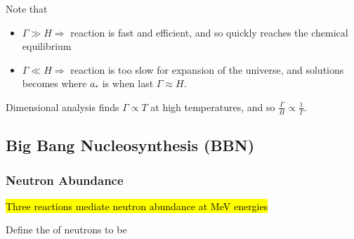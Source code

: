 \documentclass{article}
\begin{document}
Note that
\begin{itemize}
    \item $\Gamma \gg H \Rightarrow$ reaction is fast and efficient, and so quickly reaches the chemical equilibrium 
    \item $\Gamma \ll H \Rightarrow$ reaction is too slow for expansion of the universe, and solutions becomes 
    where $a_\ast$ is when last $\Gamma \approx H$. 
\end{itemize}

Dimensional analysis finds $\Gamma \propto T$ at high temperatures, and so $\frac{\Gamma}{H}\propto\frac{1}{T}$.

\subsection{Big Bang Nucleosynthesis (BBN)}

\subsubsection*{Neutron Abundance}
\hl{Three reactions mediate neutron abundance at MeV energies} 
\begin{definition}
Define the  of neutrons to be 
\end{definition}
\end{document}
